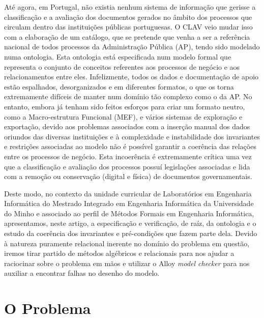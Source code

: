 \documentclass[runningheads,a4paper]{llncs}
\begin{document}
Até agora, em Portugal, não existia nenhum sistema de informação que gerisse a classificação e a avaliação dos documentos gerados no âmbito dos processos que circulam dentro das instituições públicas portuguesas. O CLAV veio mudar isso com a elaboração de um catálogo, que se pretende que venha a ser a referência nacional de todos processos da Administração Pública (AP), tendo sido modelado numa ontologia. Esta ontologia está especificada num modelo formal que representa o conjunto de conceitos referentes aos processos de negócio e aos relacionamentos entre eles. Infelizmente, todos os dados e documentação de apoio estão espalhados, desorganizados e em diferentes formatos, o que os torna extremamente difíceis de manter num domínio tão complexo como o da AP. No entanto, embora já tenham sido feitos esforços para criar um formato neutro, como a Macro-estrutura Funcional (MEF), e vários sistemas de exploração e exportação, devido aos problemas associados com a inserção manual dos dados oriundos das diversas instituições e à complexidade e instabilidade dos invariantes e restrições associadas ao modelo não é possível garantir a coerência das relações entre os processos de negócio. Esta incoerência é extremamente crítica uma vez que a classificação e avaliação dos processos possuí legislações associadas e lida com a remoção ou conservação (digital e física) de documentos governamentais\cite{clav-new}.

Deste modo, no contexto da unidade curricular de Laboratórios em Engenharia Informática do Mestrado Integrado em Engenharia Informática da Universidade do Minho e associado ao perfil de Métodos Formais em Engenharia Informática, apresentamos, neste artigo, a especificação e verificação, de raíz, da ontologia e o estudo da coerência dos invariantes e pré-condições que fazem parte dela. Devido à natureza puramente relacional inerente no domínio do problema em questão, iremos tirar partido de métodos algébricos e relacionais para nos ajudar a raciocinar sobre o problema em mãos e utilizar o Alloy \textit{model checker} para nos auxiliar a encontrar falhas no desenho do modelo.

\section{O Problema}
\end{document}
